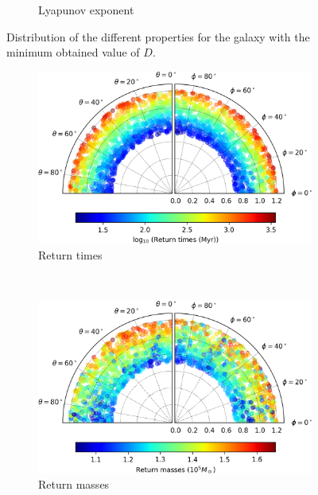\begin{figure}[h]
\begin{subfigure}[t]{0.6\textwidth}
			\caption{Lyapunov exponent}
			\label{fig: smallerD_lyapunov}
		\end{subfigure}
		\caption{Distribution of the different properties for the galaxy with the minimum obtained value of $D$.}
		\label{fig: smallerD}
	\end{figure}

	\begin{figure}[h]
		\centering
		\begin{subfigure}[t]{0.49\textwidth}
			\includegraphics[width = \textwidth]{"../Files/Week 13/smallerE_time"}
			\caption{Return times}
			\label{fig: smallerE_time}
		\end{subfigure}
		~ 
		\begin{subfigure}[t]{0.49\textwidth}
			\includegraphics[width=\textwidth]{"../Files/Week 13/smallerE_mass"}
			\caption{Return masses}
			\label{fig: smallerE_mass}
		\end{subfigure}
		\begin{subfigure}[t]{0.6\textwidth}

\end{subfigure}
\end{figure}
